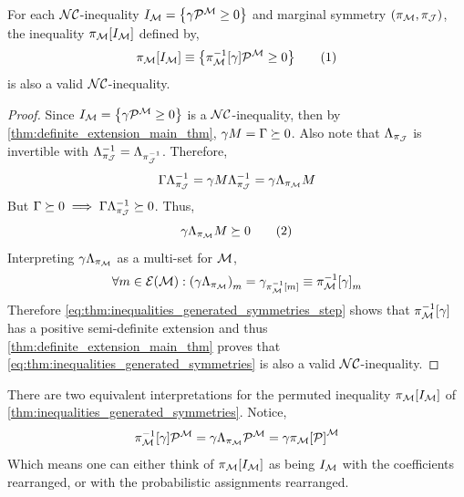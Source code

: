 \documentclass[aps, 10pt, english, twoside, pra, nofootinbib, longbibliography]{revtex4-1}
\begin{document}
    \begin{theorem}
        \label{thm:inequalities_generated_symmetries}
        For each $\mathcal{NC}$-inequality $I_{\mscenario} = \bc{\ga \tcdot \probvec^{\mscenario} \geq 0}$ and marginal symmetry $\br{\pi_{\mscenario}, \pi_{\jointvar}}$, the inequality $\pi_{\mscenario}\bs{I_{\mscenario}}$ defined by,
        \[ \pi_{\mscenario}\bs{I_{\mscenario}} \defined \bc{\pi^{-1}_{\mscenario}\bs{\ga} \tcdot \probvec^{\mscenario} \geq 0} \eq \label{eq:thm:inequalities_generated_symmetries}\]
        is also a valid $\mathcal{NC}$-inequality.
    \end{theorem}
    \begin{proof}
        Since $I_{\mscenario} = \bc{\ga \tcdot \probvec^{\mscenario} \geq 0}$ is a $\mathcal{NC}$-inequality, then by \cref{thm:definite_extension_main_thm}, $\gamma  M = \Gamma \succeq 0$. Also note that $\Lambda_{\pi_{\mathcal{J}}}$ is invertible with $\Lambda_{\pi_{\mathcal{J}}}^{-1} = \Lambda_{\pi^{-1}_{\mathcal{J}}}$. Therefore,
        \[ \Gamma\Lambda_{\pi_{\mathcal{J}}}^{-1} = \gamma  M  \Lambda_{\pi_{\mathcal{J}}}^{-1} = \gamma \Lambda_{\pi_{\mathcal{M}}} M \]
        But $\Gamma \succeq 0 \implies \Gamma\Lambda_{\pi_{\mathcal{J}}}^{-1} \succeq 0$. Thus,
        \[ \ga\tcdot\PermM{\pi_{\mscenario}}\tcdot M \succeq 0 \eq \label{eq:thm:inequalities_generated_symmetries_step}\]
        Interpreting $\gamma\Lambda_{\pi_{\mathcal{M}}}$ as a multi-set for $\mathcal{M}$,
        \[ \forall m \in \Events{\mscenario} : \br{\ga\tcdot\PermM{\pi_{\mscenario}}}_m = \ga_{\pi^{-1}_{\mscenario}\bs{m}} \defined \pi^{-1}_{\mscenario}\bs{\ga}_m \]
        Therefore \cref{eq:thm:inequalities_generated_symmetries_step} shows that $\pi^{-1}_{\mscenario}\bs{\ga}$ has a positive semi-definite extension and thus \cref{thm:definite_extension_main_thm} proves that \cref{eq:thm:inequalities_generated_symmetries} is also a valid $\mathcal{NC}$-inequality.
    \end{proof}
    \begin{remark}
        There are two equivalent interpretations for the permuted inequality $\pi_{\mscenario}\bs{I_{\mscenario}}$ of \cref{thm:inequalities_generated_symmetries}. Notice,
        \[ \pi^{-1}_{\mscenario}\bs{\ga} \tcdot \probvec^{\mscenario} = \ga \tcdot \La_{\pi_{\mscenario}} \tcdot \probvec^{\mscenario} = \ga \tcdot \pi_{\mscenario}\bs{\probvec}^{\mscenario} \]
        Which means one can either think of $\pi_{\mscenario}\bs{I_{\mscenario}}$ as being $I_{\mathcal{M}}$ with the coefficients rearranged, or with the probabilistic assignments rearranged.
    \end{remark}
\end{document}
